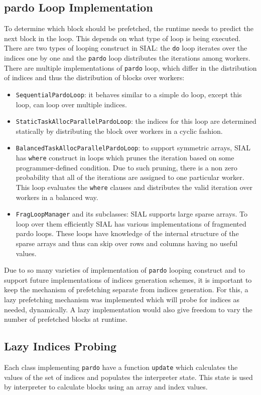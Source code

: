 \subsection{pardo Loop Implementation}
To determine which block should be prefetched, the runtime needs to predict
the next block in the loop. This depends on what type of loop is being executed.
There are two types of looping construct in SIAL: the \texttt{do} loop iterates
over the indices one by one and the \texttt{pardo} loop distributes the
iterations among workers. There are multiple implementations of \texttt{pardo} loop, which differ
in the distribution of indices and thus the distribution of blocks over workers:
\begin{itemize}
\item \texttt{SequentialPardoLoop}: it behaves similar to a simple do loop,
  except this loop, can loop over multiple indices.
\item \texttt{StaticTaskAllocParallelPardoLoop}: the indices for this loop are
  determined statically by distributing the block over workers in a cyclic fashion.
\item \texttt{BalancedTaskAllocParallelPardoLoop}: to support symmetric arrays,
  SIAL has \texttt{where} construct in loops which prunes the iteration based on
  some programmer-defined condition. Due to such pruning, there is a non zero
  probability that all of the iterations are assigned to one particular worker.
  This loop evaluates the \texttt{where} clauses and distributes the valid iteration
  over workers in a balanced way.
\item \texttt{FragLoopManager} and its subclasses: SIAL supports large sparse
  arrays. To loop over them efficiently SIAL has various implementations of
  fragmented pardo loops. These loops have knowledge of the internal structure of the
  sparse arrays and thus can skip over rows and columns having no useful values.
\end{itemize}
Due to so many varieties of implementation of \texttt{pardo} looping construct
and to support future implementations of indices generation schemes, it is
important to keep the mechanism of prefetching separate from indices generation.
For this, a lazy prefetching mechanism was implemented which will probe for indices
as needed, dynamically. A lazy implementation would also give freedom to vary the number
of prefetched blocks at runtime.

\subsection{Lazy Indices Probing}
Each class implementing \texttt{pardo} have a function \texttt{update} which
calculates the values of the set of indices and populates the interpreter state. This
state is used by interpreter to calculate blocks using an array and index values.


